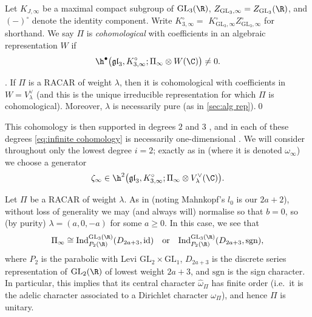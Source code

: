 \documentclass[10pt,reqno,a4paper]{amsart}
\newcommand{\omegahat}{\widehat{\omega}}
\newcommand{\GL}{\mathrm{GL}}
\begin{document}
Let $K_{J,\infty}$ be a maximal compact subgroup of $\GL_3(\R)$,  $Z_{\GL_3,\infty} = Z_{\GL_3}(\R)$, and $(-)^\circ$ denote the identity component. Write $K_{3,\infty}^\circ =$ $K_{\GL_3,\infty}^\circ Z_{\GL_3,\infty}^\circ$ for shorthand. We say $\Pi$ is \emph{cohomological} with coefficients in an algebraic representation $W$ if
\begin{equation}\label{eq:infinite cohomology}
\h^\bullet\big(\mathfrak{gl}_3,K_{3,\infty}^\circ; \Pi_\infty \otimes W(\C) \big) \neq 0.
\end{equation}

\begin{proposition}\emph{\cite[Lem.\ 4.9]{Clo90}}.
If $\Pi$ is a RACAR of weight $\lambda$, then it is cohomological with coefficients in $W = V_{\lambda}^\vee$ (and this is the unique irreducible representation for which $\Pi$ is cohomological). Moreover, $\lambda$ is necessarily pure (as in \cref{sec:alg rep}).\qed
\end{proposition}

This cohomology is then supported in degrees $2$ and $3$ \cite[Lem.\ 3.14]{Clo90}, and in each of these degrees \eqref{eq:infinite cohomology} is necessarily one-dimensional \cite[(3.2),(3.4)]{Mah05}. We will consider throughout only the lowest degree $i= 2$; exactly as in \cite[\S3.1]{Mah00} (where it is denoted $\omega_\infty$) we choose a generator
\begin{equation}\label{eq:omega infinity}
\zeta_\infty \in \h^2\big(\mathfrak{gl}_3,K_{3,\infty}^\circ; \Pi_\infty \otimes V_{\lambda}^{\vee}(\C) \big).
\end{equation}



\begin{convention}
Let $\Pi$ be a RACAR of weight $\lambda$. As in \cite[\S1]{Mah00} (noting Mahnkopf's $l_0$ is our $2a+2$), without loss of generality we may (and always will) normalise so that $b = 0$, so (by purity) $\lambda = (a,0,-a)$ for some $a \geq 0$. In this case, we see that
\begin{equation}\label{eq:Pi_infty}
	\Pi_\infty \cong \mathrm{Ind}_{P_2(\R)}^{\GL_3(\R)} (D_{2a+3}, \mathrm{id}) \quad\text{or}\quad \mathrm{Ind}_{P_2(\R)}^{\GL_3(\R)} (D_{2a+3}, \mathrm{sgn}),
\end{equation}
where $P_2$ is the parabolic with Levi $\GL_2 \times \GL_1$, $D_{2a+3}$ is the discrete series representation of $\GL_2(\R)$ of lowest weight $2a + 3$, and $\mathrm{sgn}$ is the sign character. In particular, this implies that its central character $\omegahat_{\Pi}$ has finite order (i.e.~it is the adelic character associated to a Dirichlet character $\omega_\Pi$), and hence $\Pi$ is unitary.
\end{convention}
\end{document}
